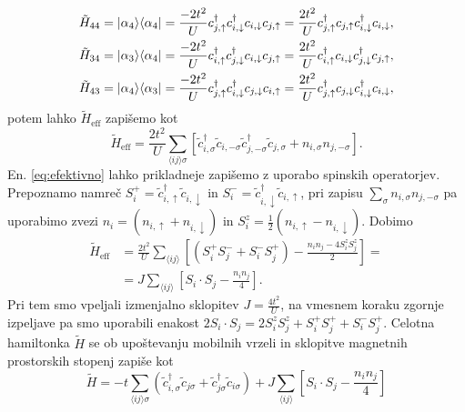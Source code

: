 \begin{appendices}
\begin{equation}
\begin{aligned}
&\tilde{H}_{44}=\vert\alpha_4\rangle\langle \alpha_4 \vert=\frac{-2t^2}{U} c^\dagger_{j,\uparrow}c^\dagger_{i,\downarrow}c_{i,\downarrow}c_{j,\uparrow}= \frac{2t^2}{U}c^\dagger_{j,\uparrow}c_{j,\uparrow}c^\dagger_{i,\downarrow}c_{i,\downarrow},\\
&\tilde{H}_{34}=\vert\alpha_3\rangle\langle \alpha_4 \vert=\frac{-2t^2}{U} c^\dagger_{i,\uparrow}c^\dagger_{j,\downarrow}c_{i,\downarrow}c_{j,\uparrow}= \frac{2t^2}{U}c^\dagger_{i,\uparrow}c_{i,\downarrow}c^\dagger_{j,\downarrow}c_{j,\uparrow},\\
&\tilde{H}_{43}=\vert\alpha_4\rangle\langle \alpha_3 \vert=\frac{-2t^2}{U} c^\dagger_{j,\uparrow}c^\dagger_{i,\downarrow}c_{j,\downarrow}c_{i,\uparrow}= \frac{2t^2}{U}c^\dagger_{j,\uparrow}c_{j,\downarrow}c^\dagger_{i,\downarrow}c_{i,\downarrow},
\end{aligned}
\end{equation}
potem lahko  $\tilde{H}_\mathrm{eff}$ zapišemo kot 
\begin{equation}\label{eq:efektivno}
\tilde{H}_\mathrm{eff} = \frac{2t^2}{U}\sum\limits_{\langle ij\rangle \sigma } \left[\tilde{c}^\dagger_{i,\sigma}\tilde{c}_{i,-\sigma}\tilde{c}^\dagger_{j,-\sigma}\tilde{c}_{j,\sigma} + n_{i,\sigma}n_{j,-\sigma}  \right].
\end{equation}
En. \eqref{eq:efektivno} lahko prikladneje zapišemo z uporabo spinskih operatorjev. Prepoznamo namreč $S_i^+=\tilde{c}^\dagger_{i,\uparrow}\tilde{c}_{i,\downarrow}$ in $S_i^-=\tilde{c}^\dagger_{i,\downarrow}\tilde{c}_{i,\uparrow}$, pri zapisu $\sum\limits_{\sigma} n_{i,\sigma}n_{j,-\sigma}$ pa uporabimo zvezi $n_i=\left( n_{i,\uparrow} + n_{i, \downarrow}\right)$ in $S_i^z=\frac{1}{2}\left(n_{i, \uparrow} - n_{i, \downarrow} \right)$. Dobimo
\begin{equation}\label{eq:mat_elti}
\begin{split}
\tilde{H}_\mathrm{eff}& = \frac{2t^2}{U} \sum\limits_{\langle ij \rangle}\left[ \left( S_i^+S_j^- + S_i^-S_j^+\right) - \frac{n_i n_j - 4S_i^zS_j^z}{2}\right]=\\
&=J\sum\limits_{\langle ij \rangle} \left[ S_i\cdot  S_j - \frac{n_i n_j}{4}\right].
\end{split}
\end{equation}
Pri tem smo vpeljali izmenjalno sklopitev $J=\frac{4t^2}{U}$, na vmesnem koraku zgornje izpeljave pa smo uporabili enakost $2S_i\cdot S_j = 2S_i^z S_j^z + S_i^+S_j^+ + S_i^-S_j^+$. Celotna hamiltonka $\tilde{H}$ se ob upoštevanju mobilnih vrzeli in sklopitve magnetnih prostorskih stopenj zapiše kot 
\begin{equation}\label{eq:tjhamiltonka}
\tilde{H} = -t\sum\limits_{\langle ij \rangle \sigma} \left(\tilde{c}^\dagger_{i,\sigma} \tilde{c}_{j\sigma} + \tilde{c}^\dagger_{j\sigma}\tilde{c}_{i\sigma}\right) +  J\sum\limits_{\langle ij \rangle} \left[ S_i\cdot  S_j - \frac{n_i n_j}{4}\right]
\end{equation}

\end{appendices}
